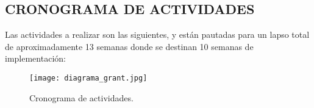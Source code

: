 
\subsection{CRONOGRAMA DE ACTIVIDADES}

    Las actividades a realizar son las siguientes, y están pautadas para un
    lapso total de aproximadamente 13 semanas donde se destinan 10 semanas de
    implementación:

    \begin{figure}[htb]
		\centering
		\caption{Cronograma de actividades.}
		\label{cronograma}
		\texttt{[image: diagrama\_grant.jpg]}
	\end{figure}

